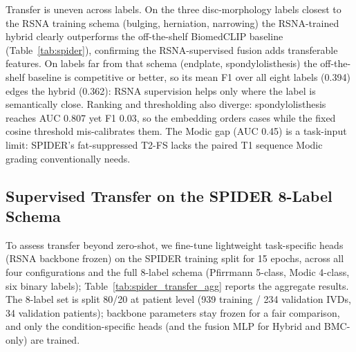 \documentclass[runningheads]{llncs}
\begin{document}
Transfer is uneven across labels. On the three disc-morphology labels closest to the RSNA training schema (bulging, herniation, narrowing) the RSNA-trained hybrid clearly outperforms the off-the-shelf BiomedCLIP baseline (Table~\ref{tab:spider}), confirming the RSNA-supervised fusion adds transferable features. On labels far from that schema (endplate, spondylolisthesis) the off-the-shelf baseline is competitive or better, so its mean F1 over all eight labels (0.394) edges the hybrid (0.362): RSNA supervision helps only where the label is semantically close. Ranking and thresholding also diverge: spondylolisthesis reaches AUC 0.807 yet F1 0.03, so the embedding orders cases while the fixed cosine threshold mis-calibrates them. The Modic gap (AUC 0.45) is a task-input limit: SPIDER's fat-suppressed T2-FS lacks the paired T1 sequence Modic grading conventionally needs.

\subsection{Supervised Transfer on the SPIDER 8-Label Schema}
\label{sec:spider_transfer}

To assess transfer beyond zero-shot, we fine-tune lightweight task-specific heads (RSNA backbone frozen) on the SPIDER training split for 15 epochs, across all four configurations and the full 8-label schema (Pfirrmann 5-class, Modic 4-class, six binary labels); Table~\ref{tab:spider_transfer_agg} reports the aggregate results. The 8-label set is split 80/20 at patient level (939 training / 234 validation IVDs, 34 validation patients); backbone parameters stay frozen for a fair comparison, and only the condition-specific heads (and the fusion MLP for Hybrid and BMC-only) are trained.
\end{document}
